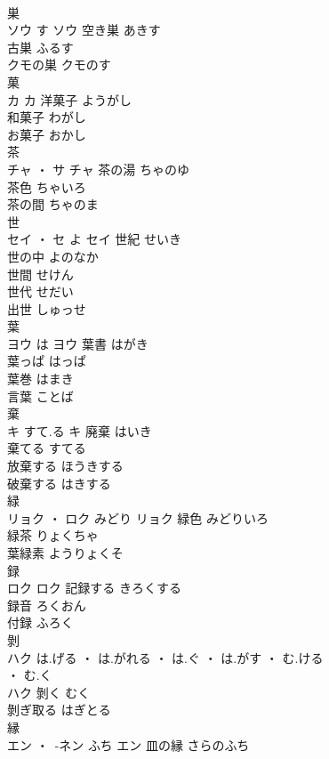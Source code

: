 \documentclass[8pt]{extreport}
\begin{document}
\begin{CJK}{UTF8}{min}
\\	巣	
\\	ソウ	す	ソウ	空き巣	あきす	
\\	古巣	ふるす	
\\	クモの巣	クモのす	
\\	菓	
\\	カ		カ	洋菓子	ようがし	
\\	和菓子	わがし	
\\	お菓子	おかし	
\\	茶	
\\	チャ ・ サ		チャ													茶の湯	ちゃのゆ	
\\	茶色	ちゃいろ	
\\	茶の間	ちゃのま	
\\	世	
\\	セイ ・ セ	よ	セイ	世紀	せいき	
\\	世の中	よのなか	
\\	世間	せけん	
\\	世代	せだい	
\\	出世	しゅっせ	
\\	葉	
\\	ヨウ	は	ヨウ	葉書	はがき	
\\	葉っぱ	はっぱ	
\\	葉巻	はまき	
\\	言葉	ことば	
\\	棄	
\\	キ	すて.る	キ	廃棄	はいき	
\\	棄てる	すてる	
\\	放棄する	ほうきする	
\\	破棄する	はきする	
\\	緑	
\\	リョク ・ ロク	みどり	リョク	緑色	みどりいろ	
\\	緑茶	りょくちゃ	
\\	葉緑素	ようりょくそ	
\\	録	
\\	ロク		ロク	記録する	きろくする	
\\	録音	ろくおん	
\\	付録	ふろく	
\\	剝	
\\	ハク	は.げる ・ は.がれる ・ は.ぐ ・ は.がす ・ む.ける
\\	・ む.く
\\	ハク	剝く	むく	
\\	剝ぎ取る	はぎとる	
\\	縁	
\\	エン ・ -ネン	ふち	エン	皿の縁	さらのふち	

\end{CJK}
\end{document}
